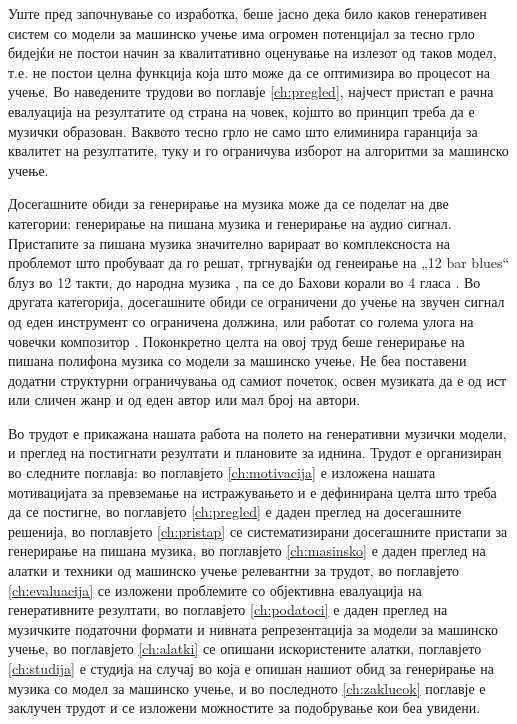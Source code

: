 Уште пред започнување со изработка, беше јасно дека било каков генеративен систем со модели за машинско учење има огромен потенцијал за тесно грло бидејќи не постои начин за квалитативно оценување на излезот од таков модел, т.е. не постои целна функција која што може да се оптимизира во процесот на учење. Во наведените трудови во поглавје \ref{ch:pregled}, најчест пристап е рачна евалуација на резултатите од страна на човек, којшто во принцип треба да е музички образован. Ваквото тесно грло не само што елиминира гаранција за квалитет на резултатите, туку и го ограничува изборот на алгоритми за машинско учење. 

Досегашните обиди за генерирање на музика може да се поделат на две категории: генерирање на пишана музика и генерирање на аудио сигнал. Пристапите за пишана музика значително варираат во комплексноста на проблемот што пробуваат да го решат, тргнувајќи од генеирање на „12 bar blues“ \cite{Eck2002} блуз во 12 такти, до народна музика \cite{Sturm2016}, па се до Бахови корали во 4 гласа \cite{Liang2017,Hadjeres2016}. Во другата категорија, досегашните обиди \cite{Oord2016} се ограничени до учење на звучен сигнал од еден инструмент со ограничена должина, или работат со голема улога на човечки композитор \cite{Ghedini2015}. Поконкретно целта на овој труд беше генерирање на пишана полифона музика со модели за машинско учење. Не беа поставени додатни структурни ограничувања од самиот почеток, освен музиката да е од ист или сличен жанр и од еден автор или мал број на автори.

Во трудот е прикажана нашата работа на полето на генеративни музички модели, и преглед на постигнати резултати и плановите за иднина. Трудот е организиран во следните поглавја: во поглавјето \ref{ch:motivacija} е изложена нашата мотивацијата за превземање на истражувањето и е дефинирана целта што треба да се постигне, во поглавјето \ref{ch:pregled} е даден преглед на досегашните решенија, во поглавјето \ref{ch:pristap} се систематизирани досегашните пристапи за генерирање на пишана музика, во поглавјето \ref{ch:masinsko} е даден преглед на алатки и техники од машинско учење релевантни за трудот, во поглавјето \ref{ch:evaluacija} се изложени проблемите со објективна евалуација на генеративните резултати, во поглавјето \ref{ch:podatoci} е даден преглед на музичките податочни формати и нивната репрезентација за модели за машинско учење, во поглавјето \ref{ch:alatki} се опишани искористените алатки, поглавјето \ref{ch:studija} е студија на случај во која е опишан нашиот обид за генерирање на музика со модел за машинско учење, и во последното \ref{ch:zaklucok} поглавје е заклучен трудот и се изложени можностите за подобрување кои беа увидени.

